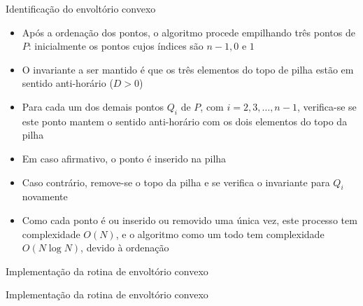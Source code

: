 \begin{frame}[fragile]{Identificação do envoltório convexo}

    \begin{itemize}
        \item Após a ordenação dos pontos, o algoritmo procede empilhando
            três pontos de $P$: inicialmente os pontos cujos índices são $n - 1, 0$ e $1$

        \item  O invariante a ser mantido é que os três elementos do topo de pilha estão em 
            sentido anti-horário ($D > 0$)

        \item Para cada um dos demais pontos $Q_i$ de $P$, com $i = 2, 3, \ldots, n - 1$, 
            verifica-se se este ponto mantem o sentido anti-horário com os dois elementos do topo 
            da pilha

        \item Em caso afirmativo, o ponto é inserido na pilha 

        \item Caso contrário, remove-se o topo da pilha e se verifica o invariante para
            $Q_i$ novamente

        \item Como cada ponto é ou inserido ou removido uma única vez, este processo tem 
            complexidade $O(N)$, e o algoritmo como um todo tem complexidade $O(N\log N)$, 
            devido à ordenação
    \end{itemize}

\end{frame}



\begin{frame}[fragile]{Implementação da rotina de envoltório convexo}
\end{frame}

\begin{frame}[fragile]{Implementação da rotina de envoltório convexo}
\end{frame}




